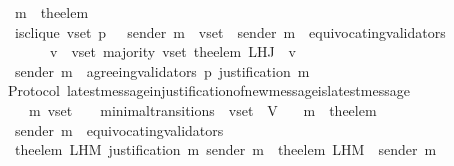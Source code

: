 \begin{isabellebody}
\ \ {\isasymlongrightarrow}\ m{\isacharprime}\ {\isacharequal}\ the{\isacharunderscore}elem\ {\isacharparenleft}{\isasymsigma}{\isacharprime}\ {\isacharminus}\ {\isasymsigma}{\isacharparenright}\isanewline
\ \ {\isasymlongrightarrow}\ is{\isacharunderscore}clique\ {\isacharparenleft}v{\isacharunderscore}set{\isacharcomma}\ p{\isacharcomma}\ {\isasymsigma}{\isacharparenright}\ {\isasymand}\ sender\ m{\isacharprime}\ {\isasymin}\ v{\isacharunderscore}set\ {\isasymand}\ sender\ m{\isacharprime}\ {\isasymnotin}\ equivocating{\isacharunderscore}validators\ {\isasymsigma}{\isacharprime}\isanewline
\ \ \ \ \ \ {\isasymand}\ {\isacharparenleft}{\isasymforall}\ v\ {\isasymin}\ v{\isacharunderscore}set{\isachardot}\ majority\ {\isacharparenleft}v{\isacharunderscore}set{\isacharcomma}\ the{\isacharunderscore}elem\ {\isacharparenleft}L{\isacharunderscore}H{\isacharunderscore}J\ {\isasymsigma}\ v{\isacharparenright}{\isacharparenright}{\isacharparenright}\ \isanewline
\ \ {\isasymlongrightarrow}\ sender\ m{\isacharprime}\ {\isasymin}\ agreeing{\isacharunderscore}validators\ {\isacharparenleft}p{\isacharcomma}\ justification\ m{\isacharprime}{\isacharparenright}{\isachardoublequoteclose}\isanewline
%
\isadelimproof
\ \ %
\endisadelimproof
%
\isatagproof
{}\isamarkupfalse%
%
\endisatagproof
{\isafoldproof}%
%
\isadelimproof
\isanewline
%
\endisadelimproof
\isanewline
\isanewline
\isanewline
\isanewline
{}\isamarkupfalse%
\ {\isacharparenleft}\ Protocol{\isacharparenright}\ latest{\isacharunderscore}message{\isacharunderscore}in{\isacharunderscore}justification{\isacharunderscore}of{\isacharunderscore}new{\isacharunderscore}message{\isacharunderscore}is{\isacharunderscore}latest{\isacharunderscore}message\ {\isacharcolon}\isanewline
\ \ {\isachardoublequoteopen}{\isasymforall}\ {\isasymsigma}\ {\isasymsigma}{\isacharprime}\ m{\isacharprime}\ v{\isacharunderscore}set{\isachardot}\ {\isacharparenleft}{\isasymsigma}{\isacharcomma}\ {\isasymsigma}{\isacharprime}{\isacharparenright}\ {\isasymin}\ minimal{\isacharunderscore}transitions\ {\isasymand}\ v{\isacharunderscore}set\ {\isasymsubseteq}\ V\isanewline
\ \ {\isasymlongrightarrow}\ m{\isacharprime}\ {\isacharequal}\ the{\isacharunderscore}elem\ {\isacharparenleft}{\isasymsigma}{\isacharprime}\ {\isacharminus}\ {\isasymsigma}{\isacharparenright}\isanewline
\ \ {\isasymlongrightarrow}\ sender\ m{\isacharprime}\ {\isasymnotin}\ equivocating{\isacharunderscore}validators\ {\isasymsigma}{\isacharprime}\isanewline
\ \ {\isasymlongrightarrow}\ the{\isacharunderscore}elem\ {\isacharparenleft}L{\isacharunderscore}H{\isacharunderscore}M\ {\isacharparenleft}justification\ m{\isacharprime}{\isacharparenright}\ {\isacharparenleft}sender\ m{\isacharprime}{\isacharparenright}{\isacharparenright}\ {\isacharequal}\ the{\isacharunderscore}elem\ {\isacharparenleft}L{\isacharunderscore}H{\isacharunderscore}M\ {\isasymsigma}\ {\isacharparenleft}sender\ m{\isacharprime}{\isacharparenright}{\isacharparenright}{\isachardoublequoteclose}\isanewline

\end{isabellebody}
